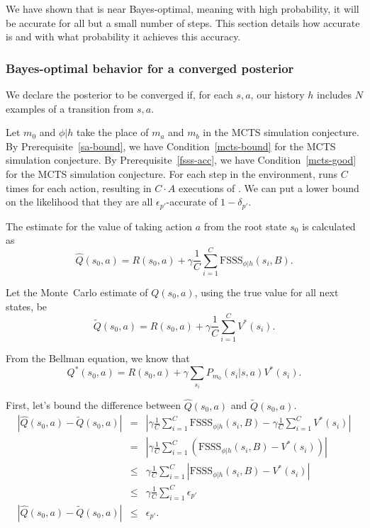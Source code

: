 We have shown that  is near Bayes-optimal, meaning with high probability, it will be accurate for all but a small number of steps. This section details how accurate  is and with what probability it achieves this accuracy.

\subsubsection{Bayes-optimal behavior for a converged posterior}
\label{sec-conv}
We declare the posterior to be converged if, for each $s,a$, our history $h$ includes $N$ examples of a transition from $s,a$.

Let $m_0$ and $\phi|h$ take the place of $m_a$ and $m_b$ in the MCTS simulation conjecture.
By Prerequisite~\ref{sa-bound}, we have Condition~\ref{mcts-bound} for the MCTS simulation conjecture. 
By Prerequisite~\ref{fsss-acc}, we have Condition~\ref{mcts-good} for the MCTS simulation conjecture.
For each step in the environment,  runs  $C$ times for each action, resulting in $C\cdot A$ executions of . We can put a lower bound on the likelihood that they are all $\epsilon_{p'}$-accurate of $1-\delta_{p'}$.

The estimate for the value of taking action $a$ from the root state $s_0$ is calculated as
\begin{equation}
\hat Q(s_0, a) = R(s_0,a) + \gamma \frac 1 C \sum_{i=1}^C \mbox{FSSS}_{\phi|h}(s_i, B).
\end{equation}

Let the Monte~Carlo estimate of $Q(s_0,a)$, using the true value for all next states, be
\begin{equation}
\tilde Q(s_0, a) = R(s_0,a) + \gamma \frac 1 C \sum_{i=1}^C V^*(s_i).
\end{equation}

From the Bellman equation, we know that
\begin{equation}
Q^*(s_0, a) = R(s_0,a) + \gamma \sum_{s_i} P_{m_0}(s_i|s,a) V^*(s_i).
\end{equation}

First, let's bound the difference between $\hat Q(s_0, a)$ and $\tilde Q(s_0, a)$.
\begin{eqnarray}
\nonumber |\hat Q(s_0, a) - \tilde Q(s_0, a)| &=& \left|\gamma \frac 1 C \sum_{i=1}^C \mbox{FSSS}_{\phi|h}(s_i, B) - \gamma \frac 1 C \sum_{i=1}^C V^*(s_i)\right|\\
\nonumber &=& \left|\gamma \frac 1 C \sum_{i=1}^C \left(\mbox{FSSS}_{\phi|h}(s_i, B) -  V^*(s_i)\right)\right|\\
\nonumber &\leq& \gamma \frac 1 C \sum_{i=1}^C \left|\mbox{FSSS}_{\phi|h}(s_i, B) -  V^*(s_i)\right|\\
\nonumber &\leq& \gamma \frac 1 C \sum_{i=1}^C \epsilon_{p'}\\
|\hat Q(s_0, a) - \tilde Q(s_0, a)| &\leq& \epsilon_{p'}.
\end{eqnarray}

